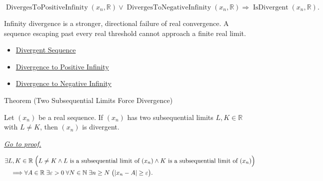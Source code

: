 \begin{remark*}
\[
\operatorname{DivergesToPositiveInfinity}(x_n,\mathbb{R})
\lor
\operatorname{DivergesToNegativeInfinity}(x_n,\mathbb{R})
\Longrightarrow
\operatorname{IsDivergent}(x_n,\mathbb{R}).
\]
\end{remark*}

\begin{remark*}[Interpretation]
Infinity divergence is a stronger, directional failure of real convergence.
A sequence escaping past every real threshold cannot approach a finite real
limit.
\end{remark*}

\begin{dependencies}
\begin{itemize}
  \item \hyperref[def:divergent-sequence]{Divergent Sequence}
  \item \hyperref[def:diverges-to-positive-infinity]{Divergence to Positive Infinity}
  \item \hyperref[def:diverges-to-negative-infinity]{Divergence to Negative Infinity}
\end{itemize}
\end{dependencies}


\begin{theorembox}{Theorem (Two Subsequential Limits Force Divergence)}
\begin{theorem}
\label{thm:two-subsequential-limits-force-divergence}
Let $(x_n)$ be a real sequence. If $(x_n)$ has two subsequential limits
$L,K\in\mathbb{R}$ with $L\ne K$, then $(x_n)$ is divergent.

\smallskip
\noindent
\hyperref[prf:two-subsequential-limits-force-divergence]{\textit{Go to proof.}}
\end{theorem}
\end{theorembox}

\begin{remark*}
\[
\begin{aligned}
&\exists L,K\in\mathbb{R}\;
\Bigl(
  L\ne K
  \land
  L\text{ is a subsequential limit of }(x_n)
  \land
  K\text{ is a subsequential limit of }(x_n)
\Bigr)\\
&\quad\Longrightarrow
\forall A\in\mathbb{R}\;\exists \varepsilon>0\;\forall N\in\mathbb{N}
\;\exists n\ge N\;\bigl(|x_n-A|\ge\varepsilon\bigr).
\end{aligned}
\]
\end{remark*}

